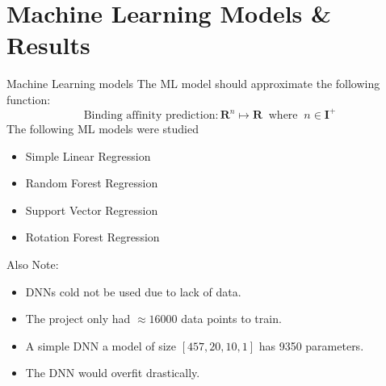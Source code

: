 \documentclass{beamer}
\begin{document}
\section{Machine Learning Models \& Results}
\begin{frame}[t]{Machine Learning models}
The ML model should approximate the following function:
$$ \textrm{Binding affinity prediction} : \mathbf{R}^n \mapsto \mathbf{R} \;\; \textrm{where} \;\; n \in \mathbf{I}^+$$
The following ML models were studied
\begin{itemize}
\item Simple Linear Regression
\item Random Forest Regression
\item Support Vector Regression
\item Rotation Forest Regression
\end{itemize}
Also Note:
\begin{itemize}
\item DNNs cold not be used due to lack of data.  
\item The project only had $\approx 16000$ data points to train.
\item A simple DNN a model of size $[457,  20, 10,  1]$ has 9350 parameters.
\item The DNN would overfit drastically.
\end{itemize}

\end{frame}
\end{document}
